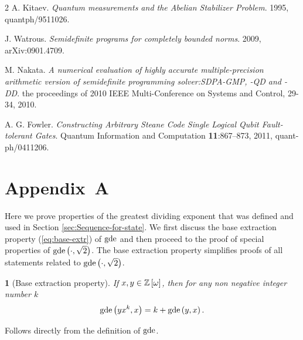 \documentclass[english,journal]{extarticle}
\makeatletter
\theoremstyle{plain}
\theoremstyle{plain}
\theoremstyle{plain}
\theoremstyle{definition}
\theoremstyle{plain}
\newenvironment{proof}[1][\proofname]{\par
     \normalfont\topsep6\p@\@plus6\p@\relax
     \trivlist
     \itemindent\parindent
     \item[\hskip\labelsep
           \scshape
       #1]\ignorespaces
   }{%
     \endtrivlist\@endpefalse
   }
\providecommand{\proofname}{Proof}
\theoremstyle{plain}
\newtheorem{prop}{\protect\propositionname}
\providecommand{\propositionname}{\inputencoding{latin9}Proposition}
\makeatother
\begin{document}
\begin{thebibliography}{2}
 A. Kitaev. \emph{Quantum measurements and the Abelian Stabilizer Problem}. 1995,
{quantph/9511026}.

 J. Watrous. \emph{Semidefinite programs for completely bounded norms}. 2009,
{arXiv:0901.4709}.

 M. Nakata. \emph{A numerical evaluation of highly accurate multiple-precision arithmetic version of semidefinite programming solver:SDPA-GMP, -QD and -DD}.
the proceedings of 2010 IEEE Multi-Conference on Systems and Control, 29-34, 2010.

 A. G. Fowler. \emph{Constructing Arbitrary Steane Code Single
Logical Qubit Fault-tolerant Gates}.  Quantum Information and Computation {\bf
11}:867--873, 2011,
{quant-ph/0411206}.


\end{thebibliography}

\section*{Appendix~A}
\label{app:A}
\noindent
\label{app:1}
Here we prove properties of the greatest dividing exponent that was defined
and used in Section \ref{sec:Sequence-for-state}.  We first discuss
the base extraction property (\ref{eq:base-extr}) of $\mathbf{\mathrm{gde}}$ and then
proceed to the proof of special properties of $\mathbf{\mathrm{gde}}\left(\cdot,\sqrt{2}\right)$.
The base extraction property simplifies proofs of all statements related
to $\mathbf{\mathrm{gde}}\left(\cdot,\sqrt{2}\right)$. 
\begin{prop}[Base extraction property]
If $x,y\in\mathbb{Z}\left[\omega\right]$, then for any non negative integer number $k$
\[
\mathbf{\mathrm{gde}}\left(yx^{k},x\right)=k+\mathbf{\mathrm{gde}}\left(y,x\right).
\]
\end{prop}
\begin{proof}
Follows directly from the definition of $\mathbf{\mathrm{gde}}$.
\end{proof}
\end{document}
